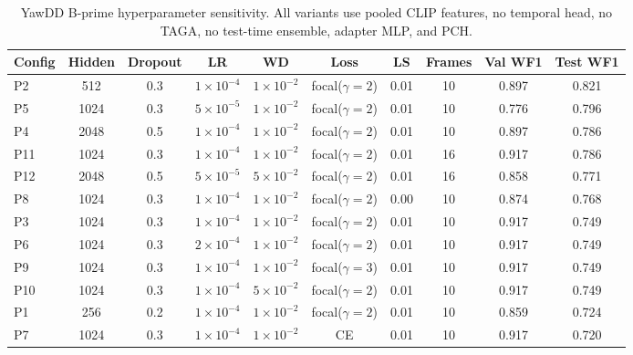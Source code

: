 \begin{table}[t]
\centering
\caption{YawDD B-prime hyperparameter sensitivity. All variants use pooled CLIP features, no temporal head, no TAGA, no test-time ensemble, adapter MLP, and PCH.}
\label{tab:yawdd_attribution}
\begin{tabular}{lccccccccc}
\toprule
Config & Hidden & Dropout & LR & WD & Loss & LS & Frames & Val WF1 & Test WF1 \\
\midrule
P2 & 512 & 0.3 & $1\times10^{-4}$ & $1\times10^{-2}$ & focal($\gamma=2$) & 0.01 & 10 & 0.897 & 0.821 \\
P5 & 1024 & 0.3 & $5\times10^{-5}$ & $1\times10^{-2}$ & focal($\gamma=2$) & 0.01 & 10 & 0.776 & 0.796 \\
P4 & 2048 & 0.5 & $1\times10^{-4}$ & $1\times10^{-2}$ & focal($\gamma=2$) & 0.01 & 10 & 0.897 & 0.786 \\
P11 & 1024 & 0.3 & $1\times10^{-4}$ & $1\times10^{-2}$ & focal($\gamma=2$) & 0.01 & 16 & 0.917 & 0.786 \\
P12 & 2048 & 0.5 & $5\times10^{-5}$ & $5\times10^{-2}$ & focal($\gamma=2$) & 0.01 & 16 & 0.858 & 0.771 \\
P8 & 1024 & 0.3 & $1\times10^{-4}$ & $1\times10^{-2}$ & focal($\gamma=2$) & 0.00 & 10 & 0.874 & 0.768 \\
P3 & 1024 & 0.3 & $1\times10^{-4}$ & $1\times10^{-2}$ & focal($\gamma=2$) & 0.01 & 10 & 0.917 & 0.749 \\
P6 & 1024 & 0.3 & $2\times10^{-4}$ & $1\times10^{-2}$ & focal($\gamma=2$) & 0.01 & 10 & 0.917 & 0.749 \\
P9 & 1024 & 0.3 & $1\times10^{-4}$ & $1\times10^{-2}$ & focal($\gamma=3$) & 0.01 & 10 & 0.917 & 0.749 \\
P10 & 1024 & 0.3 & $1\times10^{-4}$ & $5\times10^{-2}$ & focal($\gamma=2$) & 0.01 & 10 & 0.917 & 0.749 \\
P1 & 256 & 0.2 & $1\times10^{-4}$ & $1\times10^{-2}$ & focal($\gamma=2$) & 0.01 & 10 & 0.859 & 0.724 \\
P7 & 1024 & 0.3 & $1\times10^{-4}$ & $1\times10^{-2}$ & CE & 0.01 & 10 & 0.917 & 0.720 \\
\bottomrule
\end{tabular}
\end{table}
